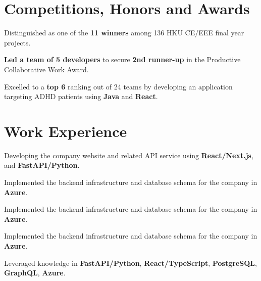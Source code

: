 \documentclass[a4paper,10pt]{article}
\begin{document}
\section{Competitions, Honors and Awards}
\begin{tightitemize}
  \item Distinguished as one of the \textbf{11 winners} among 136 HKU CE/EEE final year projects.
\end{tightitemize}

\begin{tightitemize}
  \item \textbf{Led a team of 5 developers} to secure \textbf{2nd runner-up} in the Productive Collaborative Work Award.
  \item Excelled to a \textbf{top 6} ranking out of 24 teams by developing an application targeting ADHD patients using \textbf{Java} and \textbf{React}.
\end{tightitemize}


\section{Work Experience}
\begin{tightitemize}
  \item Developing the company website and related API service using \textbf{React/Next.js}, and \textbf{FastAPI/Python}.
  \item Implemented the backend infrastructure and database schema for the company in \textbf{Azure}.
  \item Implemented the backend infrastructure and database schema for the company in \textbf{Azure}.
  \item Implemented the backend infrastructure and database schema for the company in \textbf{Azure}.
  \item Leveraged knowledge in \textbf{FastAPI/Python}, \textbf{React/TypeScript}, \textbf{PostgreSQL}, \textbf{GraphQL}, \textbf{Azure}.
\end{tightitemize}
\end{document}
